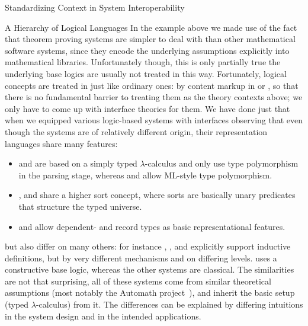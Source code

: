\begin{omgroup}[id=logics,creators=miko]{Standardizing Context in System Interoperability}
\begin{omgroup}[id=logics.integrating]{A Hierarchy of Logical Languages}
  In the example above we made use of the fact that theorem proving systems are simpler to
  deal with than other mathematical software systems, since they encode the underlying
  assumptions explicitly into mathematical libraries. Unfortunately though, this is only
  partially true the underlying base logics are usually not treated in this
  way. Fortunately, logical concepts are treated in {\omdoc} just like ordinary ones: by
  content markup in {\cmathml} or {\openmath}, so that there is no fundamental barrier to
  treating them as the theory contexts above; we only have to come up with interface
  theories for them. We have done just that when we equipped various logic-based systems
  with {\omdoc} interfaces observing that even though the systems are of relatively
  different origin, their representation languages share many features:
  \begin{itemize}
  \item {\tps} and {\pvs} are based on a simply typed $\lambda$-calculus and only use type
    polymorphism in the parsing stage, whereas {\OMEGA} and {\lambdaclam} allow ML-style
    type polymorphism.
  \item {\OMEGA}, {\inka} and {\pvs} share a higher sort concept, where sorts are
    basically unary predicates that structure the typed universe.
  \item {\pvs} and {\coq} allow dependent- and record types as basic representational
    features.
  \end{itemize}
  but also differ on many others: for instance {\inka}, {\pvs}, and {\coq} explicitly
  support inductive definitions, but by very different mechanisms and on differing
  levels. {\coq} uses a constructive base logic, whereas the other systems are classical.
  The similarities are not that surprising, all of these systems come from similar
  theoretical assumptions (most notably the Automath project~\cite{Bruijn80}), and inherit
  the basic setup (typed $\lambda$-calculus) from it. The differences can be explained by
  differing intuitions in the system design and in the intended applications.


\end{omgroup}
\end{omgroup}
